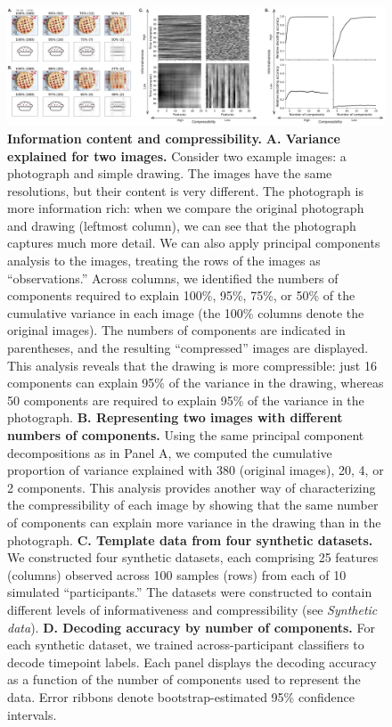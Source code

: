 \documentclass[english, 11pt]{article}
\begin{document}
\begin{figure}[tp]

  \centering
  \includegraphics[width=\textwidth]{figs/information_and_compressibility}
  
  \caption{\textbf{Information content and compressibility.} \textbf{A.
  Variance explained for two images.} Consider two example images: a photograph
  and simple drawing. The images have the same resolutions, but their content
  is very different. The photograph is more information rich: when we compare
  the original photograph and drawing (leftmost column), we can see that the
  photograph captures much more detail. We can also apply principal components
  analysis to the images, treating the rows of the images as ``observations.''
  Across columns, we identified the numbers of components required to explain
  100\%, 95\%, 75\%, or 50\% of the cumulative variance in each image (the
  100\% columns denote the original images). The numbers of components are
  indicated in parentheses, and the resulting ``compressed'' images are
  displayed. This analysis reveals that the drawing is more compressible: just
  16 components can explain 95\% of the variance in the drawing, whereas 50
  components are required to explain 95\% of the variance in the photograph.
  \textbf{B. Representing two images with different numbers of components.}
  Using the same principal component decompositions as in Panel A, we computed
  the cumulative proportion of variance explained with 380 (original images),
  20, 4, or 2 components. This analysis provides another way of characterizing
  the compressibility of each image by showing that the same number of
  components can explain more variance in the drawing than in the photograph.
  \textbf{C. Template data from four synthetic datasets.} We constructed four
  synthetic datasets, each comprising 25 features (columns) observed across 100
  samples (rows) from each of 10 simulated ``participants.'' The datasets were
  constructed to contain different levels of informativeness and
  compressibility (see \textit{Synthetic data}). \textbf{D. Decoding accuracy
  by number of components.} For each synthetic dataset, we trained
  across-participant classifiers to decode timepoint labels.  Each panel displays the
  decoding accuracy as a function of the number of components used to represent
  the data. Error ribbons denote bootstrap-estimated 95\% confidence intervals.}
\label{fig:information-compression} 
\end{figure}
\end{document}
